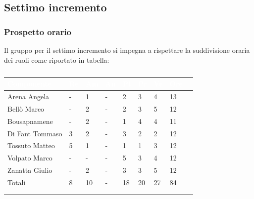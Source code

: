     \subsection{Settimo incremento} 
    {
    \subsubsection{Prospetto orario}
    {
    Il gruppo per il settimo incremento si impegna a rispettare la suddivisione oraria dei ruoli come riportato in tabella:
      \setlength{\freewidth}{\dimexpr\textwidth-30\tabcolsep}
      \renewcommand{\arraystretch}{1.0}
      \setlength{\aboverulesep}{0pt}
      \setlength{\belowrulesep}{0pt}
      \begin{longtable}{C{.4\freewidth} C{.1\freewidth} C{.1\freewidth} C{.1\freewidth} C{.1\freewidth} C{.1\freewidth} C{.1\freewidth} C{.1\freewidth} C{.1\freewidth}}
      \toprule
      \textcolor{white}{\textbf{Componente}}&
      \textcolor{white}{\textbf{Re}}&
      \textcolor{white}{\textbf{Am}}&
      \textcolor{white}{\textbf{An}}&
      \textcolor{white}{\textbf{Pt}}&
      \textcolor{white}{\textbf{Pr}}&
      \textcolor{white}{\textbf{Ve}}&
      \textcolor{white}{\textbf{Ore}}\\
      \toprule
      \endhead

      Arena Angela & - & 1 & -  & 2 & 3 & 4 & 13 \\      
      Bellò Marco & - & 2 & - & 2 & 3 & 5 & 12 \\      
      Bousapnamene & - & 2 & - & 1 & 4 & 4 & 11 \\      
      Di Fant Tommaso & 3 & 2 & - & 3 & 2 & 2 & 12 \\      
      Tossuto Matteo & 5 & 1 & - & 1 & 1 & 3 & 12 \\      
      Volpato Marco & - & - & - & 5 & 3 & 4 & 12 \\      
      Zanatta Giulio & - & 2 & - & 3 & 3 & 5 & 12 \\      
      Totali & 8 & 10 & - & 18 & 20 & 27 & 84 \\
      \bottomrule 
      \\
      \caption{}

      \end{longtable} 

}}
